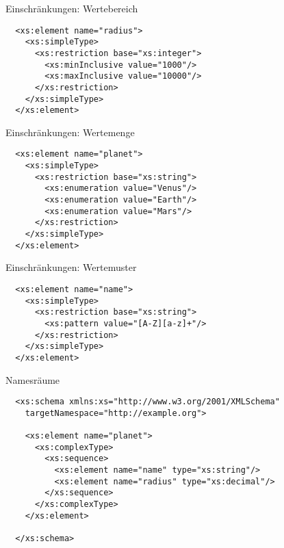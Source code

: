 \documentclass{beamer}
\begin{document}
\begin{frame}[fragile]{Einschränkungen: Wertebereich}

	\lstset{language=XML}
	\begin{lstlisting}		
  <xs:element name="radius">
    <xs:simpleType>
      <xs:restriction base="xs:integer">
        <xs:minInclusive value="1000"/>
        <xs:maxInclusive value="10000"/>
      </xs:restriction>
    </xs:simpleType>
  </xs:element>
	\end{lstlisting}
	
\end{frame}

\begin{frame}[fragile]{Einschränkungen: Wertemenge}

	\lstset{language=XML}
	\begin{lstlisting}	
  <xs:element name="planet">
    <xs:simpleType>
      <xs:restriction base="xs:string">
        <xs:enumeration value="Venus"/>
        <xs:enumeration value="Earth"/>
        <xs:enumeration value="Mars"/>
      </xs:restriction>
    </xs:simpleType>
  </xs:element>
	\end{lstlisting}
		
\end{frame}

\begin{frame}[fragile]{Einschränkungen: Wertemuster}
	
	\lstset{language=XML}
	\begin{lstlisting}	
  <xs:element name="name">
    <xs:simpleType>
      <xs:restriction base="xs:string">
        <xs:pattern value="[A-Z][a-z]+"/>
      </xs:restriction>
    </xs:simpleType>
  </xs:element>
	\end{lstlisting}
	
\end{frame}

\begin{frame}[fragile]{Namesräume}
	
	\lstset{language=XML}
	\begin{lstlisting}	
  <xs:schema xmlns:xs="http://www.w3.org/2001/XMLSchema"
    targetNamespace="http://example.org">

    <xs:element name="planet">
      <xs:complexType>
        <xs:sequence>
          <xs:element name="name" type="xs:string"/>
          <xs:element name="radius" type="xs:decimal"/>
        </xs:sequence>
      </xs:complexType>
    </xs:element>
  
  </xs:schema>
	\end{lstlisting}
	
\end{frame}
\end{document}
